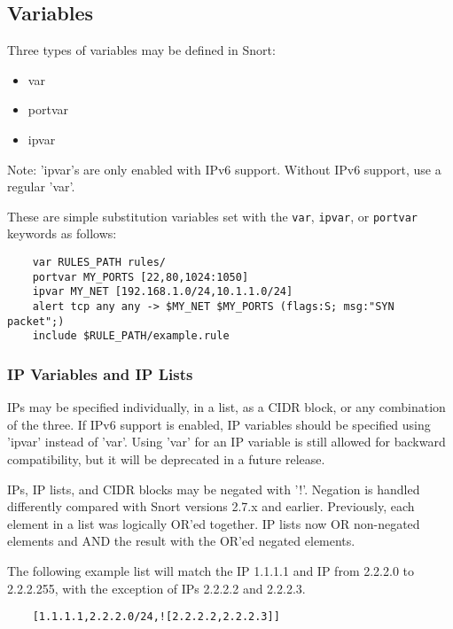 \documentclass[english]{report}
\newenvironment{note}{
\samepage
    \vspace{10pt}{\textsf{
        {\hspace{7pt}\Huge{$\triangle$\hspace{-12.5pt}{\Large{$^!$}}}}\hspace{5pt}
        {\Large{NOTE}}
    }
    }
   \begin{center}
    \par\vspace{-17pt}

    \begin{lrbox}{\savepar}
    \begin{minipage}[r]{6in}
}
{
    \end{minipage}
    \end{lrbox}
    \fbox{
        \usebox{
            \savepar
	}
    }
    \par\vskip10pt
    \end{center}
}
\newenvironment{note}{
        \begin{rawhtml}
        <p><table border="1"><tr><td><b>
        Note:&nbsp;&nbsp;</b>
        \end{rawhtml}
}{
        \begin{rawhtml}
        </b></td></tr></table></p>
        \end{rawhtml}
}
\begin{document}
\subsection{Variables}
\label{variables}

Three types of variables may be defined in Snort:

\begin{itemize}
\item var
\item portvar
\item ipvar
\end{itemize}

\begin{note}

Note: 'ipvar's are only enabled with IPv6 support. Without IPv6 support, use a
regular 'var'.

\end{note}

These are simple substitution variables set with the {\tt var}, {\tt ipvar}, or
{\tt portvar} keywords as follows:

\begin{verbatim}
    var RULES_PATH rules/
    portvar MY_PORTS [22,80,1024:1050]
    ipvar MY_NET [192.168.1.0/24,10.1.1.0/24]
    alert tcp any any -> $MY_NET $MY_PORTS (flags:S; msg:"SYN packet";)
    include $RULE_PATH/example.rule
\end{verbatim}

\subsubsection{IP Variables and IP Lists}

IPs may be specified individually, in a list, as a CIDR block, or any
combination of the three.  If IPv6 support is enabled, IP variables should be
specified using 'ipvar' instead of 'var'.  Using 'var' for an IP variable is
still allowed for backward compatibility, but it will be deprecated in a future
release.

IPs, IP lists, and CIDR blocks may be negated with '!'.  Negation is handled
differently compared with Snort versions 2.7.x and earlier.  Previously, each
element in a list was logically OR'ed together.  IP lists now OR non-negated
elements and AND the result with the OR'ed negated elements.  

The following example list will match the IP 1.1.1.1 and IP from 2.2.2.0 to
2.2.2.255, with the exception of IPs 2.2.2.2 and 2.2.2.3.

\begin{verbatim}
    [1.1.1.1,2.2.2.0/24,![2.2.2.2,2.2.2.3]] 
\end{verbatim}
\end{document}
